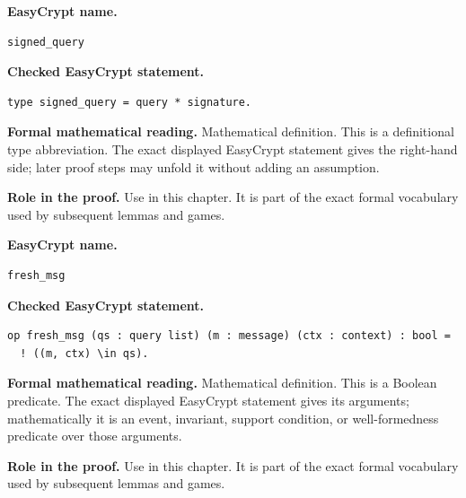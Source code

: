 \begin{formaldefinition}
\noindent\textbf{EasyCrypt name.}
\begin{lstlisting}[language=EasyCrypt,basicstyle=\ttfamily\scriptsize]
signed_query
\end{lstlisting}
\noindent\textbf{Checked EasyCrypt statement.}
\begin{lstlisting}[language=EasyCrypt,basicstyle=\ttfamily\scriptsize]
type signed_query = query * signature.
\end{lstlisting}
\noindent\textbf{Formal mathematical reading.}
Mathematical definition. This is a definitional type abbreviation.  The exact displayed EasyCrypt statement gives the right-hand side; later proof steps may unfold it without adding an assumption.

\noindent\textbf{Role in the proof.}
Use in this chapter. It is part of the exact formal vocabulary used by subsequent lemmas and games.

\end{formaldefinition}

\begin{formaldefinition}
\noindent\textbf{EasyCrypt name.}
\begin{lstlisting}[language=EasyCrypt,basicstyle=\ttfamily\scriptsize]
fresh_msg
\end{lstlisting}
\noindent\textbf{Checked EasyCrypt statement.}
\begin{lstlisting}[language=EasyCrypt,basicstyle=\ttfamily\scriptsize]
op fresh_msg (qs : query list) (m : message) (ctx : context) : bool =
  ! ((m, ctx) \in qs).
\end{lstlisting}
\noindent\textbf{Formal mathematical reading.}
Mathematical definition. This is a Boolean predicate.  The exact displayed EasyCrypt statement gives its arguments; mathematically it is an event, invariant, support condition, or well-formedness predicate over those arguments.

\noindent\textbf{Role in the proof.}
Use in this chapter. It is part of the exact formal vocabulary used by subsequent lemmas and games.

\end{formaldefinition}

